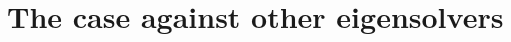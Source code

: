 \documentclass[10pt, a4paper, twocolumn]{article} %
\begin{document}
    \section{The case against other eigensolvers}


    \printbibliography[title={Bibliography}]

\end{document}
